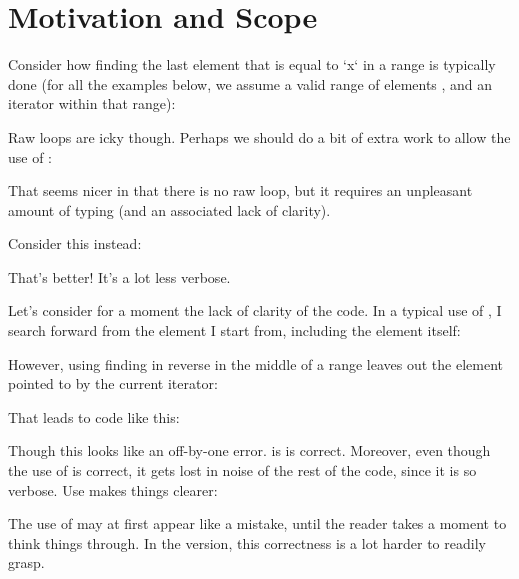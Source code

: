 \section{Motivation and Scope}

Consider how finding the last element that is equal to `x` in a range is
typically done (for all the examples below, we assume a valid range of
elements \code{[first, last)}, and an iterator  within that range):



Raw loops are icky though.  Perhaps we should do a bit of extra work to allow
the use of :



That seems nicer in that there is no raw loop, but it requires an unpleasant
amount of typing (and an associated lack of clarity).

Consider this instead:



That's better!  It's a lot less verbose.

Let's consider for a moment the lack of clarity of the
 code.  In a typical use of , I
search forward from the element I start from, including the element itself:



However, using finding in reverse in the middle of a range leaves out the
element pointed to by the current iterator:



That leads to code like this:



Though this looks like an off-by-one error. is is correct.  Moreover, even
though the use of  is correct, it gets lost in noise of the rest
of the code, since it is so verbose.  Use  makes things
clearer:



The use of  may at first appear like a mistake, until the reader
takes a moment to think things through.  In the 
version, this correctness is a lot harder to readily grasp.
